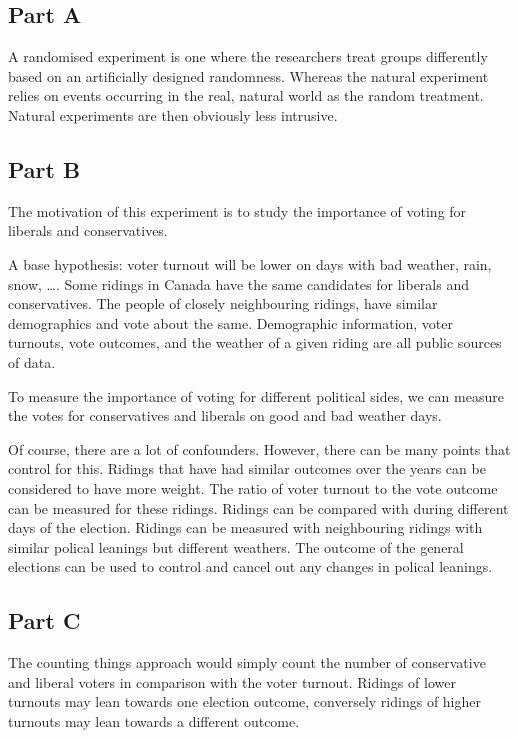 \documentclass[../ass.tex]{subfiles}
\begin{document}
\subsection{Part A}
A randomised experiment is one where the researchers treat groups differently based on an artificially designed randomness.
Whereas the natural experiment relies on events occurring in the real, natural world as the random treatment. 
Natural experiments are then obviously less intrusive. 

\subsection{Part B}
The motivation of this experiment is to study the importance of voting for liberals and conservatives. 

A base hypothesis: voter turnout will be lower on days with bad weather, rain, snow, \dots. 
Some ridings in Canada have the same candidates for liberals and conservatives.
The people of closely neighbouring ridings, have similar demographics and vote about the same. 
Demographic information, voter turnouts, vote outcomes, and the weather of a given riding are all public sources of data. 

To measure the importance of voting for different political sides, we can measure the votes for conservatives and liberals on good and bad weather days. 

Of course, there are a lot of confounders. 
However, there can be many points that control for this.
Ridings that have had similar outcomes over the years can be considered to have more weight.
The ratio of voter turnout to the vote outcome can be measured for these ridings. 
Ridings can be compared with during different days of the election. 
Ridings can be measured with neighbouring ridings with similar polical leanings but different weathers.  
The outcome of the general elections can be used to control and cancel out any changes in polical leanings.

\subsection{Part C}
The counting things approach would simply count the number of conservative and liberal voters in comparison with the voter turnout. 
Ridings of lower turnouts may lean towards one election outcome, conversely ridings of higher turnouts may lean towards a different outcome. 
\end{document}
